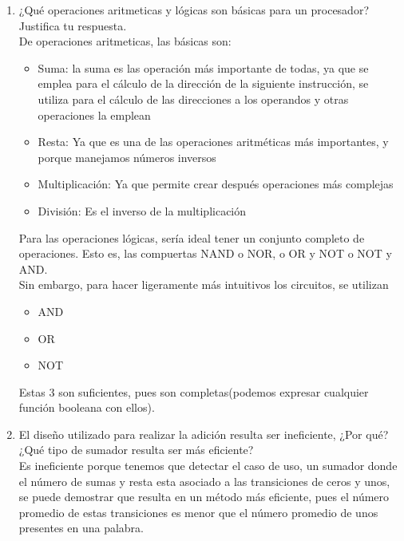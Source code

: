\documentclass{article}
\begin{document}
    \begin{enumerate}
        \item 
            ¿Qué operaciones aritmeticas y lógicas son básicas para un procesador?
            Justifica tu respuesta.\\
            De operaciones aritmeticas, las básicas son:
            \begin{itemize}
                \item
                Suma: la suma es las operación más importante de todas, ya que 
                se emplea para el cálculo de la dirección de la siguiente 
                instrucción, se utiliza para el cálculo de las direcciones a los 
                operandos y otras operaciones la emplean
                \item
                Resta: Ya que es una de las operaciones aritméticas más 
                importantes, y porque manejamos números inversos
                \item
                Multiplicación: Ya que permite crear después operaciones más 
                complejas
                \item
                División: Es el inverso de la multiplicación
            \end{itemize}

            Para las operaciones lógicas, sería ideal tener un conjunto completo de 
            operaciones. Esto es, las compuertas NAND o NOR, o OR y NOT o NOT y AND. \\
            Sin embargo, para hacer ligeramente más intuitivos los circuitos, 
            se utilizan
            \begin{itemize}
            \item
            AND
            \item
            OR
            \item
            NOT
            \end{itemize}
            Estas 3 son suficientes, pues son completas(podemos expresar 
            cualquier función booleana con ellos).	

		\item
        El diseño utilizado para realizar la adición resulta ser ineficiente, 
        ¿Por qué? ¿Qué tipo de sumador resulta ser más eficiente?\\
        Es ineficiente porque tenemos que detectar el caso de uso, un sumador 
        donde el número de sumas y resta esta asociado a las transiciones de 
        ceros y unos, se puede demostrar que resulta en un método más eficiente, 
        pues el número promedio de estas transiciones es menor que el número 
        promedio de unos presentes en una palabra.
		

\end{enumerate}
\end{document}
